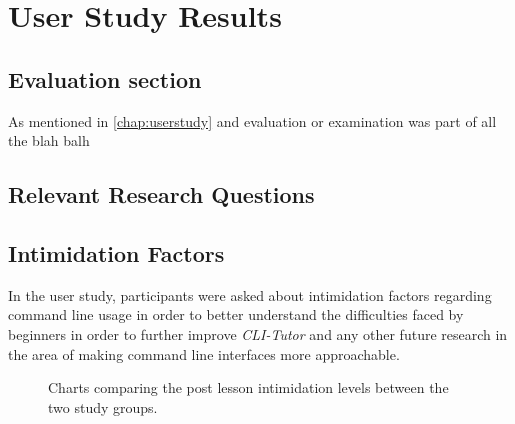 \section{User Study Results}

\subsection{Evaluation section}

As mentioned in \autoref{chap:userstudy} and evaluation or examination was part of all the blah balh


\FloatBarrier %

\subsection{Relevant Research Questions}

\subsection{Intimidation Factors}

In the user study, participants were asked about intimidation factors regarding
command line usage in order to better understand the difficulties faced by
beginners in order to further improve \textit{CLI-Tutor} and any other future
research in the area of making command line interfaces more approachable.

\begin{figure}[htbp]
	\centering
	\scalebox{0.67}{}
	\vspace{-2em}
	\caption{Charts comparing the post lesson intimidation levels between the two study groups.}
	\label{fig:confidence}
\end{figure}

